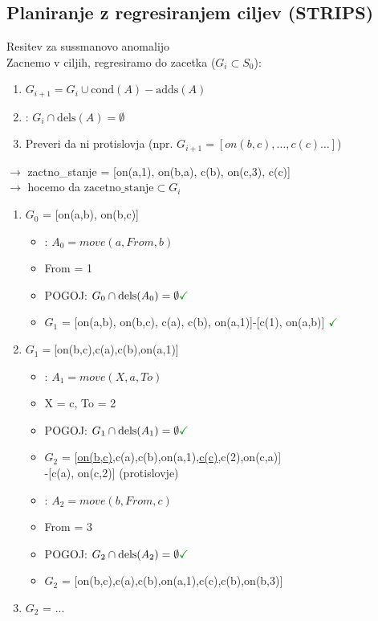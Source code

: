 \subsection{Planiranje z regresiranjem ciljev (STRIPS)}
Resitev za sussmanovo anomalijo\\
Zacnemo v ciljih, regresiramo do zacetka ($G_i \subset S_0$):
\begin{enumerate}[noitemsep,topsep=0pt,leftmargin=*]
\item $G_{i+1} = G_i \cup \text{cond}(A) - \text{adds}(A)$
\item {}: $G_{i} \cap \text{dels}(A) = \emptyset$
\item Preveri da ni protislovja (npr. $G_{i+1} = \left[on(b,c), \dots, c(c) \dots\right]$)
\end{enumerate}
$\rightarrow$ zactno\_stanje = [on(a,1), on(b,a), c(b), on(c,3), c(c)]\\
$\rightarrow$ hocemo da $\text{zacetno\_stanje} \subset G_i$
\begin{enumerate}[noitemsep,topsep=0pt,leftmargin=*,]
    \item $G_0$ = [on(a,b), on(b,c)]
    \begin{itemize}[noitemsep,topsep=0pt,leftmargin=0.5cm]
        \item {}: $A_0=move(a, From, b)$
        \item From = 1
        \item POGOJ: $G_0 \cap \text{dels}(A_0) = \emptyset \green{\checkmark}$
        \item $G_1$ = [on(a,b), on(b,c), c(a), c(b), on(a,1)]-[c(1), on(a,b)] $\green{\checkmark}$
    \end{itemize}
    \item $G_1=$[on(b,c),c(a),c(b),on(a,1)]
    \begin{itemize}[noitemsep,topsep=0pt,leftmargin=0.5cm]
        \item {}: $A_1=move(X, a, To)$
        \item X = c, To = 2
        \item POGOJ: $G_1 \cap \text{dels}(A_1) = \emptyset \green{\checkmark}$
        \item $G_2$ = [\underline{on(b,c)},c(a),c(b),on(a,1),\underline{c(c)},c(2),on(c,a)]\\ -[c(a), on(c,2)] \xmark (protislovje)
        \item {}: $A_2=move(b, From, c)$
        \item From = 3
        \item POGOJ: $G_2 \cap \text{dels}(A_2) = \emptyset \green{\checkmark}$
        \item $G_2$ = [on(b,c),c(a),c(b),on(a,1),c(c),c(b),on(b,3)] \cmark
    \end{itemize}
    \item $G_2$ = ...     
\end{enumerate}

